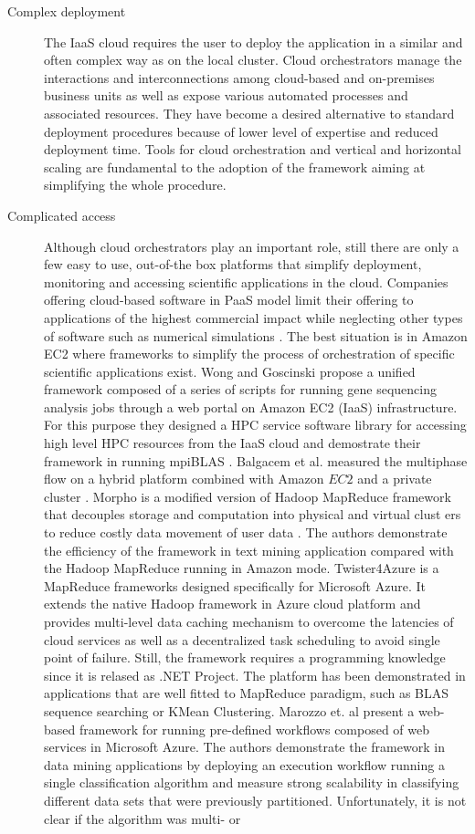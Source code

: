\documentclass[3p,times]{elsarticle}
\begin{document}
\begin{description}
\item[Complex deployment] The IaaS cloud requires the user to deploy the application in a similar and often complex way as on the local cluster. Cloud orchestrators manage the interactions and interconnections among cloud-based and on-premises business units as well as expose various automated processes and associated resources. They have become a desired alternative to standard deployment procedures because of lower level of expertise and reduced deployment time. Tools for cloud orchestration and vertical and horizontal scaling are fundamental to the adoption of the framework aiming at simplifying the whole procedure.

\item[Complicated access] Although cloud orchestrators play an important role, still there are only a few easy to use, out-of-the box platforms that simplify deployment, monitoring and accessing scientific applications in the cloud. Companies offering cloud-based software in PaaS model limit their offering to applications of the highest commercial impact while neglecting other types of software such as numerical simulations \cite{CloudStack} \cite{OpenStack}. The best situation is in Amazon EC2 where frameworks to simplify the process of orchestration of specific scientific applications exist. Wong and Goscinski propose a unified framework composed of a series of scripts for running gene sequencing analysis jobs through a web portal \cite{Wong2013} on Amazon EC2 (IaaS) infrastructure. For this purpose they designed a HPC service software library for accessing high level HPC resources from the IaaS cloud and demostrate their framework in running mpiBLAS \cite{mpiBlas}. Balgacem et al. measured the multiphase flow on a hybrid platform combined with Amazon $EC2$ and a private cluster \cite{BenBelgacem2015}. Morpho is a modified version of Hadoop MapReduce framework that decouples storage and computation into physical and virtual clust ers to reduce costly data movement of user data \cite{Lu2014}. The authors demonstrate the efficiency of the  framework in text mining application compared with the Hadoop MapReduce running in Amazon mode. Twister4Azure is a MapReduce frameworks designed specifically for Microsoft Azure. It extends the native Hadoop framework in Azure cloud platform and provides multi-level data caching mechanism to overcome the latencies of cloud services as well as a decentralized task scheduling to avoid single point of failure. Still, the framework requires a programming knowledge since it is relased as .NET Project. The platform has been demonstrated in applications that are well fitted to MapReduce paradigm, such as BLAS sequence searching or KMean Clustering. Marozzo et. al \cite{catlett2013cloud} present a web-based framework for running pre-defined workflows composed of web services in Microsoft Azure. The authors demonstrate the framework in data mining applications by deploying an execution workflow running a single classification algorithm and measure strong scalability in classifying different data sets that were previously partitioned. Unfortunately, it is not clear if the algorithm was multi- or 
\end{description}
\end{document}
